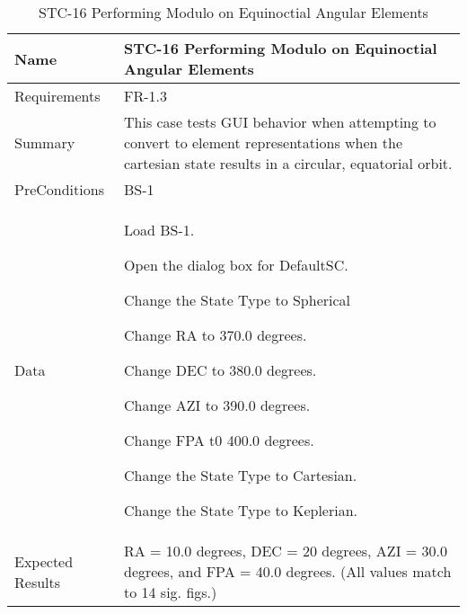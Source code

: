 
\begin{table}[htbp!]
\centering
      \begin{tabular}{|p{1.05 in} |p{4.75 in} |}
      \hline
         \rowcolor[rgb]{0.8,0.8,0.8} Name & STC-16 Performing Modulo on Equinoctial Angular Elements\\
         \hline
         Requirements & FR-1.3\\  \hline
         Summary &
         This  case tests GUI behavior when attempting to convert to element representations when the
         cartesian state results in a circular, equatorial orbit.
         \\     \hline
         PreConditions & BS-1\\     \hline
         Data &
         \begin{compactenum}
             \item Load BS-1.
             \item Open the dialog box for DefaultSC.
             \item Change the State Type to Spherical
             \item Change RA to 370.0 degrees.
             \item Change DEC to 380.0 degrees.
             \item Change AZI to 390.0 degrees.
             \item Change FPA t0 400.0 degrees.
             \item Change the State Type to Cartesian.
             \item Change the State Type to Keplerian.
         \end{compactenum}
         \\ \hline
         Expected Results & RA = 10.0 degrees, DEC = 20 degrees, AZI = 30.0 degrees, and FPA = 40.0 degrees. (All
         values match to 14 sig. figs.)\\
      \hline
      \end{tabular}
      \label{Table:STC-16}
      \caption{STC-16 Performing Modulo on Equinoctial Angular Elements}
\end{table} 